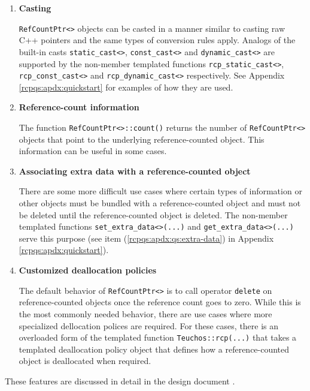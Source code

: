 \documentclass[pdf,ps2pdf,11pt]{SANDreport}
\begin{document}
\begin{enumerate}

\item \textbf{Casting}

{}\texttt{Ref\-Count\-Ptr<>} objects can be casted in a manner similar
to casting raw C++ pointers and the same types of conversion rules
apply.  Analogs of the built-in casts {}\texttt{static\_\-cast<>},
{}\texttt{const\_\-cast<>} and {}\texttt{dynamic\_\-cast<>} are
supported by the non-member templated functions
{}\texttt{rcp\_\-static\_\-cast<>}, {}\texttt{rcp\_\-const\_\-cast<>}
and {}\texttt{rcp\_\-dynamic\_\-cast<>} respectively.  See Appendix
{}\ref{rcpqs:apdx:quickstart} for examples of how they are used.

\item \textbf{Reference-count information}

The function {}\texttt{Ref\-Count\-Ptr<>\-::count()} returns the
number of {}\texttt{Ref\-Count\-Ptr<>} objects that point to the
underlying reference-counted object.  This information can be useful
in some cases.

\item \textbf{Associating extra data with a reference-counted object}

There are some more difficult use cases where certain types of
information or other objects must be bundled with a reference-counted
object and must not be deleted until the reference-counted object is
deleted.  The non-member templated functions
{}\texttt{set\-\_extra\-\_data<>(...)} and
{}\texttt{get\-\_extra\-\_data<>(...)} serve this purpose (see item
({}\ref{rcpqs:apdx:qs:extra-data}) in Appendix
{}\ref{rcpqs:apdx:quickstart}).

\item \textbf{Customized deallocation policies}

The default behavior of {}\texttt{Ref\-Count\-Ptr<>} is to call
operator {}\texttt{delete} on reference-counted objects once the
reference count goes to zero.  While this is the most commonly needed
behavior, there are use cases where more specialized dellocation
polices are required.  For these cases, there is an overloaded form of
the templated function {}\texttt{Teuchos\-::rcp(...)} that takes a
templated deallocation policy object that defines how a
reference-counted object is deallocated when required.

\end{enumerate}

These features are discussed in detail in the design document
{}\cite{ref:RefCountPtr}.
\end{document}
